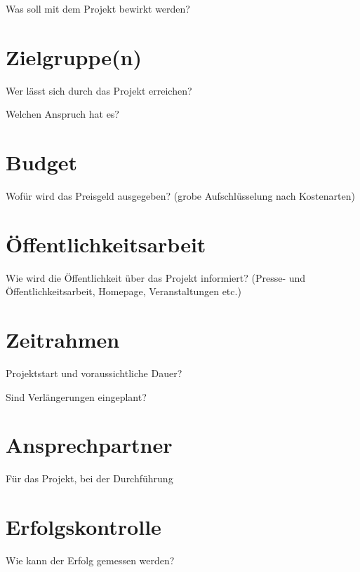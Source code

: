 \documentclass[12pt]{zettel}
\begin{document}
Was soll mit dem Projekt bewirkt werden?


\section{Zielgruppe(n)}

Wer lässt sich durch das Projekt erreichen?

Welchen Anspruch hat es?


\section{Budget}

Wofür wird das Preisgeld ausgegeben?
(grobe Aufschlüsselung nach Kostenarten)


\section{Öffentlichkeitsarbeit}

Wie wird die Öffentlichkeit über das Projekt informiert?
(Presse- und Öffentlichkeitsarbeit, Homepage,
Veranstaltungen etc.)


\section{Zeitrahmen}

Projektstart und voraussichtliche Dauer?

Sind
Verlängerungen
eingeplant?


\section{Ansprechpartner}
Für das
Projekt, bei
der
Durchführung


\section{Erfolgskontrolle}
Wie kann der
Erfolg
gemessen
werden?
\end{document}
